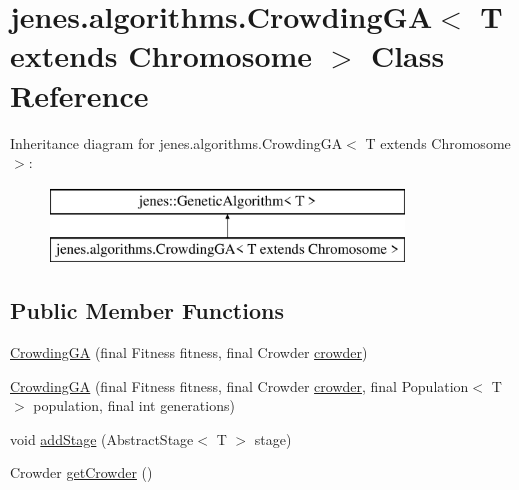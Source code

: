 \hypertarget{classjenes_1_1algorithms_1_1_crowding_g_a_3_01_t_01extends_01_chromosome_01_4}{\section{jenes.\-algorithms.\-Crowding\-G\-A$<$ T extends Chromosome $>$ Class Reference}
\label{classjenes_1_1algorithms_1_1_crowding_g_a_3_01_t_01extends_01_chromosome_01_4}
}
Inheritance diagram for jenes.\-algorithms.\-Crowding\-G\-A$<$ T extends Chromosome $>$\-:\begin{figure}[H]
\begin{center}
\leavevmode
\includegraphics[height=2.000000cm]{classjenes_1_1algorithms_1_1_crowding_g_a_3_01_t_01extends_01_chromosome_01_4}
\end{center}
\end{figure}
\subsection*{Public Member Functions}
\begin{DoxyCompactItemize}
\item 
\hyperlink{classjenes_1_1algorithms_1_1_crowding_g_a_3_01_t_01extends_01_chromosome_01_4_a5f9de70a8e431de7e0f9bbb6bb42ec1e}{Crowding\-G\-A} (final Fitness fitness, final Crowder \hyperlink{classjenes_1_1algorithms_1_1_crowding_g_a_3_01_t_01extends_01_chromosome_01_4_aa747112afbb20cb4faec643ccc73e396}{crowder})
\item 
\hyperlink{classjenes_1_1algorithms_1_1_crowding_g_a_3_01_t_01extends_01_chromosome_01_4_ad3e5e26f962e7839e076b61efcd5704f}{Crowding\-G\-A} (final Fitness fitness, final Crowder \hyperlink{classjenes_1_1algorithms_1_1_crowding_g_a_3_01_t_01extends_01_chromosome_01_4_aa747112afbb20cb4faec643ccc73e396}{crowder}, final Population$<$ T $>$ population, final int generations)
\item 
void \hyperlink{classjenes_1_1algorithms_1_1_crowding_g_a_3_01_t_01extends_01_chromosome_01_4_ad241412becfe0073cbeb06418a1e49f3}{add\-Stage} (Abstract\-Stage$<$ T $>$ stage)
\item 
Crowder \hyperlink{classjenes_1_1algorithms_1_1_crowding_g_a_3_01_t_01extends_01_chromosome_01_4_a6cc270cedf906a0743cb743b30c2ba02}{get\-Crowder} ()
\end{DoxyCompactItemize}
